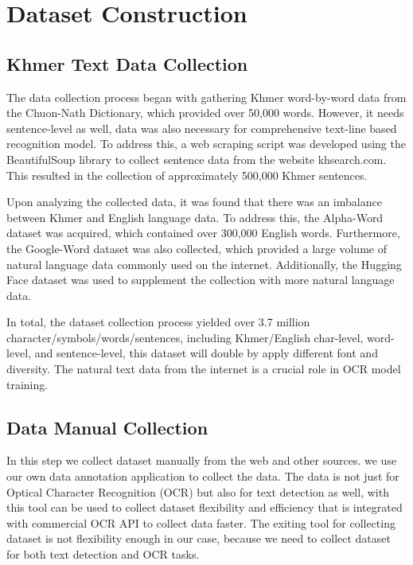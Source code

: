 
\chapter{Dataset Construction}
\label{ch:dataset}


\vspace{-1cm}
\setlength{\parindent}{0pt}
\vspace{0.3cm}

\section{Khmer Text Data Collection}
\label{sec:text-source}

{\englishfont\fontsize{13.5pt}{17pt}\selectfont

The data collection process began with gathering Khmer word-by-word data from the 
Chuon-Nath Dictionary, which provided over 50,000 words. However, it needs
sentence-level as well, data was also necessary for comprehensive text-line based recognition model. 
To address this, a web scraping script was developed using the BeautifulSoup library 
to collect sentence data from the website khsearch.com. This resulted in the collection 
of approximately 500,000 Khmer sentences.

Upon analyzing the collected data, it was found that there was an imbalance between 
Khmer and English language data. To address this, the Alpha-Word dataset was acquired,
which contained over 300,000 English words. Furthermore, the Google-Word dataset 
was also collected, which provided a large volume of natural language data commonly 
used on the internet. Additionally, the Hugging Face dataset was used to supplement 
the collection with more natural language data.

In total, the dataset collection process yielded over 3.7 million 
character/symbols/words/sentences, including Khmer/English char-level, word-level, 
and sentence-level, this dataset will double by apply different font and diversity. The natural text data from the internet is a crucial role in
OCR model training.

\section{Data Manual Collection}
\label{sec:manualcollection}
In this step we collect dataset manually from the web and other sources. we 
use our own data annotation application to collect the data. The data is not just for Optical 
Character Recognition (OCR) but also for text detection as well, with this tool can be
used to collect dataset flexibility and efficiency that is integrated with commercial OCR API
to collect data faster. The exiting tool for collecting dataset is not flexibility enough in
our case, because we need to collect dataset for both text detection and OCR tasks.

}
